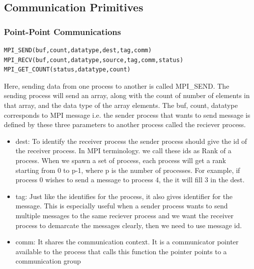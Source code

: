 \documentclass[12pt]{book}
\begin{document}
\subsection{Communication Primitives}
\subsubsection{Point-Point Communications}
\begin{lstlisting}
MPI_SEND(buf,count,datatype,dest,tag,comm)
MPI_RECV(buf,count,datatype,source,tag,comm,status)
MPI_GET_COUNT(status,datatype,count)
\end{lstlisting}
Here, sending data from one process to another is called MPI\_SEND.
The sending process will send an array, along with the count of number of elements in that array, and the data type of the array elements. 
The buf, count, datatype corresponds to MPI message i.e. the sender process that wants to send message is defined by these three parameters to another process called the reciever process. 
\begin{itemize}
    \item dest: To identify the receiver process the sender process should give the id of the receiver process. In MPI terminology. we call these ids as Rank of a process. When we spawn a set of process, each process will get a rank starting from 0 to p-1, where p is the number of processes. For example, if process 0 wishes to send a message to process 4, the it will fill 3 in the dest.
    \item tag: Just like the identifies for the process, it also gives identifier for the message. This is especially useful when a sender process wants to send multiple messages to the same reciever process and we want the receiver process to demarcate the messages clearly, then we need to use message id.
    \item comm: It shares the communication context. It is a communicator pointer available to the process that calls this function the pointer points to a communication group 
\end{itemize}
\end{document}
